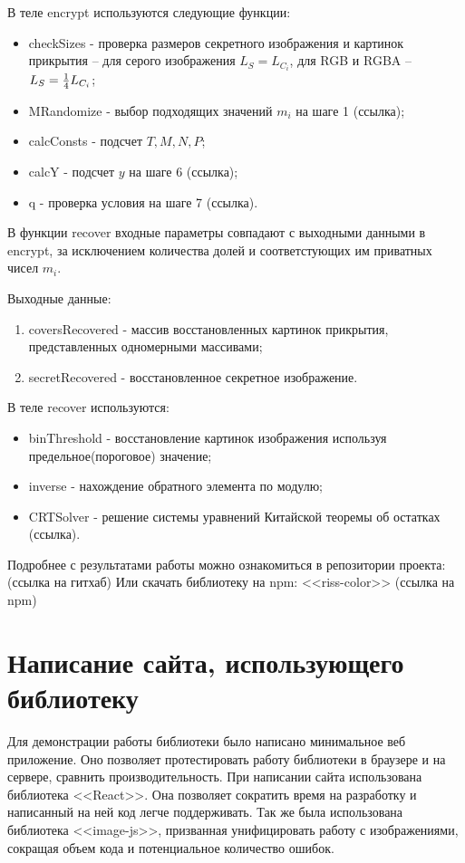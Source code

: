 \documentclass[a4paper,article,14pt]{extarticle}
\begin{document}
В теле encrypt используются следующие функции: 
\begin{itemize}
    \setlength{\itemindent}{2em}
    \item checkSizes - проверка размеров секретного изображения и картинок прикрытия -- для серого изображения $L_S=L_{C_i}$,
    для RGB и RGBA -- $L_S={1\over 4}L_{C_i}$;
    \item MRandomize - выбор подходящих значений $m_i$ на шаге 1 (ссылка);
    \item calcConsts - подсчет $T, M, N, P$;
    \item calcY - подсчет $y$ на шаге 6 (ссылка);
    \item q - проверка условия на шаге 7 (ссылка).
\end{itemize}

В функции recover входные параметры совпадают с выходными данными в encrypt, за исключением количества долей и соответстующих им 
приватных чисел $m_i$.

Выходные данные:
\begin{enumerate}
    \item coversRecovered - массив восстановленных картинок прикрытия, представленных одномерными массивами;
    \item secretRecovered - восстановленное секретное изображение.
\end{enumerate}

В теле recover используются: 
\begin{itemize}
    \item binThreshold - восстановление картинок изображения используя предельное(пороговое) значение;
    \item inverse - нахождение обратного элемента по модулю;
    \item CRTSolver - решение системы уравнений Китайской теоремы об остатках (ссылка).
\end{itemize}

Подробнее с результатами работы можно ознакомиться в репозитории проекта: (ссылка на гитхаб) 
Или скачать библиотеку на npm: <<riss-color>> (ссылка на npm)


\newpage
\section{Написание сайта, использующего библиотеку}

Для демонстрации работы библиотеки было написано минимальное веб приложение. Оно позволяет протестировать работу библиотеки в
браузере и на сервере, сравнить производительность.
При написании сайта использована библиотека <<React>>\cite{react}. Она позволяет сократить время на разработку 
и написанный на ней код легче поддерживать.
Так же была использована библиотека <<image-js>>, призванная унифицировать работу с изображениями, сокращая объем кода и потенциальное
количество ошибок.
\end{document}
